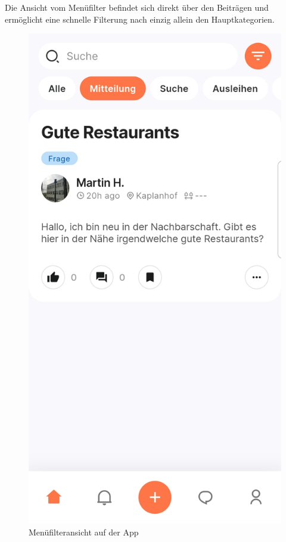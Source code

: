 Die Ansicht vom Menüfilter befindet sich direkt über den Beiträgen und ermöglicht eine schnelle Filterung nach einzig allein den Hauptkategorien.

\begin{figure}[h]
  \centering
  \includegraphics[width=\textwidth]{pics/menu-filter.jpg}
  \caption{Menüfilteransicht auf der App}
\end{figure}

